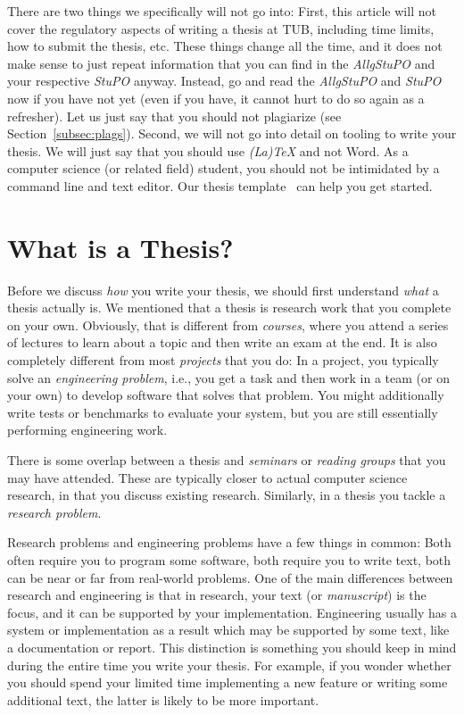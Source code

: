 \documentclass[a4]{article}
\begin{document}
There are two things we specifically will not go into:
First, this article will not cover the regulatory aspects of writing a thesis at TUB, including time limits, how to submit the thesis, etc.
These things change all the time, and it does not make sense to just repeat information that you can find in the \emph{AllgStuPO} and your respective \emph{StuPO} anyway.
Instead, go and read the \emph{AllgStuPO} and \emph{StuPO} now if you have not yet (even if you have, it cannot hurt to do so again as a refresher).
Let us just say that you should not plagiarize (see Section~\ref{subsec:plags}).
Second, we will not go into detail on tooling to write your thesis.
We will just say that you should use \emph{(La)TeX} and not Word.
As a computer science (or related field) student, you should not be intimidated by a command line and text editor.
Our thesis template~\cite{thesis-template} can help you get started.

\section{What is a Thesis?}
\label{sec:what}

Before we discuss \emph{how} you write your thesis, we should first understand \emph{what} a thesis actually is.
We mentioned that a thesis is research work that you complete on your own.
Obviously, that is different from \emph{courses}, where you attend a series of lectures to learn about a topic and then write an exam at the end.
It is also completely different from most \emph{projects} that you do:
In a project, you typically solve an \emph{engineering problem}, i.e., you get a task and then work in a team (or on your own) to develop software that solves that problem.
You might additionally write tests or benchmarks to evaluate your system, but you are still essentially performing engineering work.

There is some overlap between a thesis and \emph{seminars} or \emph{reading groups} that you may have attended.
These are typically closer to actual computer science research, in that you discuss existing research.
Similarly, in a thesis you tackle a \emph{research problem}.

Research problems and engineering problems have a few things in common:
Both often require you to program some software, both require you to write text, both can be near or far from real-world problems.
One of the main differences between research and engineering is that in research, your text (or \emph{manuscript}) is the focus, and it can be supported by your implementation.
Engineering usually has a system or implementation as a result which may be supported by some text, like a documentation or report.
This distinction is something you should keep in mind during the entire time you write your thesis.
For example, if you wonder whether you should spend your limited time implementing a new feature or writing some additional text, the latter is likely to be more important.
\end{document}
